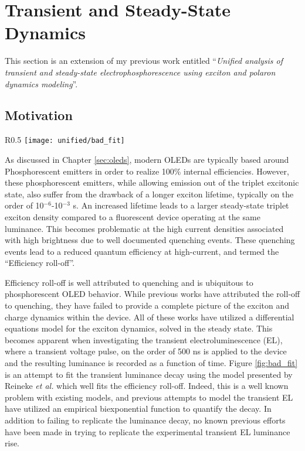 \documentclass[../thesis.tex]{subfiles}
\begin{document}
\chapter{Transient and Steady-State Dynamics}\label{sec:unified}

This section is an extension of my previous work entitled ``\textit{Unified analysis of transient and steady-state electrophosphorescence using exciton and polaron dynamics modeling}''.\supercite{Hershey2016}

\section{Motivation}

\begin{wrapfigure}{R}{0.5\textwidth}
\centering
\texttt{[image: unified/bad\_fit]}
\caption{Fitting the transient electroluminescence decay without polaron dynamics.}
\label{fig:bad_fit}
\end{wrapfigure}

As discussed in Chapter \ref{sec:oleds}, modern OLEDs are typically based around Phosphorescent emitters in order to realize 100\% internal efficiencies.\supercite{Baldo2000,Baldo1998a,Tsutsui1999,OBrien1999a}
However, these phosphorescent emitters, while allowing emission out of the triplet excitonic state, also suffer from the drawback of a longer exciton lifetime, typically on the order of 10$^{-6}$-10$^{-3}$ s.\supercite{Baldo1998a,Holmes2003}
An increased lifetime leads to a larger steady-state triplet exciton density compared to a fluorescent device operating at the same luminance.  
This becomes problematic at the high current densities associated with high brightness due to well documented quenching events.\supercite{Reineke2007,Reineke2007a,Reineke2009,Mezyk2005,Kalinowski2002,Song2010,Erickson2014}
These quenching events lead to a reduced quantum efficiency at high-current, and termed the ``Efficiency roll-off''.  


Efficiency roll-off is well attributed to quenching and is ubiquitous to phosphorescent OLED behavior.\supercite{Reineke2007,Erickson2014,Murawski2013,Giebink2008c}
While previous works have attributed the roll-off to quenching, they have failed to provide a complete picture of the exciton and charge dynamics within the device.
All of these works have utilized a differential equations model for the exciton dynamics, solved in the steady state.
This becomes apparent when investigating the transient electroluminescence (EL), where a transient voltage pulse, on the order of 500 ns is applied to the device and the resulting luminance is recorded as a function of time.  
Figure \ref{fig:bad_fit} is an attempt to fit the transient luminance decay using the model presented by Reineke \textit{et al.}\supercite{Reineke2007} which well fits the efficiency roll-off.  
Indeed, this is a well known problem with existing models, and previous attempts to model the transient EL have utilized an empirical biexponential function to quantify the decay.\supercite{Erickson2014,Giebink2008c,Baldo2000a,Zhang2012}
In addition to failing to replicate the luminance decay, no known previous efforts have been made in trying to replicate the experimental transient EL luminance rise.
\end{document}
